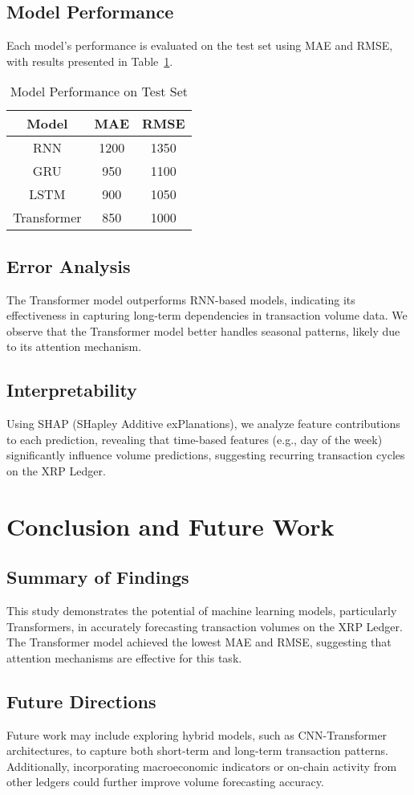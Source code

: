 \documentclass{article}
\begin{document}
\subsection{Model Performance}
Each model's performance is evaluated on the test set using MAE and RMSE, with results presented in Table~\ref{tab:results}.
\begin{table}[h]
\centering
\begin{tabular}{|c|c|c|}
\hline
\textbf{Model} & \textbf{MAE} & \textbf{RMSE} \\
\hline
RNN & 1200 & 1350 \\
GRU & 950 & 1100 \\
LSTM & 900 & 1050 \\
Transformer & 850 & 1000 \\
\hline
\end{tabular}
\caption{Model Performance on Test Set}
\label{tab:results}
\end{table}

\subsection{Error Analysis}
The Transformer model outperforms RNN-based models, indicating its effectiveness in capturing long-term dependencies in transaction volume data. We observe that the Transformer model better handles seasonal patterns, likely due to its attention mechanism.

\subsection{Interpretability}
Using SHAP (SHapley Additive exPlanations), we analyze feature contributions to each prediction, revealing that time-based features (e.g., day of the week) significantly influence volume predictions, suggesting recurring transaction cycles on the XRP Ledger.

\section{Conclusion and Future Work}

\subsection{Summary of Findings}
This study demonstrates the potential of machine learning models, particularly Transformers, in accurately forecasting transaction volumes on the XRP Ledger. The Transformer model achieved the lowest MAE and RMSE, suggesting that attention mechanisms are effective for this task.

\subsection{Future Directions}
Future work may include exploring hybrid models, such as CNN-Transformer architectures, to capture both short-term and long-term transaction patterns. Additionally, incorporating macroeconomic indicators or on-chain activity from other ledgers could further improve volume forecasting accuracy.
\end{document}
